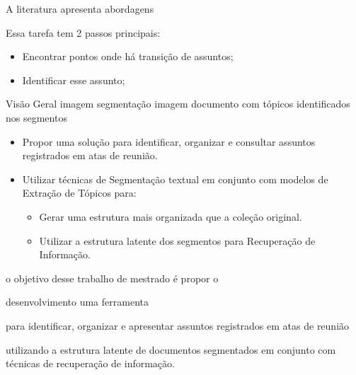 A literatura apresenta abordagens 


Essa tarefa tem 2 passos principais:
\begin{itemize}
	\item Encontrar pontos onde há transição de assuntos;
	\item Identificar esse assunto;
\end{itemize}







Visão Geral 
imagem segmentação 
imagem documento com tópicos identificados nos segmentos








\begin{itemize}
	\item Propor uma solução para identificar, organizar e consultar assuntos registrados em atas de reunião.  
	\item Utilizar técnicas de Segmentação textual em conjunto com modelos de Extração de Tópicos para:
			\begin{itemize}
	\item Gerar uma estrutura mais organizada que a coleção original.
	\item Utilizar a estrutura latente dos segmentos para Recuperação de Informação. 
		\end{itemize}
\end{itemize}










o objetivo desse trabalho de mestrado é propor o 





desenvolvimento uma ferramenta 


para identificar, organizar e apresentar assuntos registrados em atas de reunião 


utilizando a estrutura latente de documentos segmentados em conjunto com técnicas de recuperação de informação.











